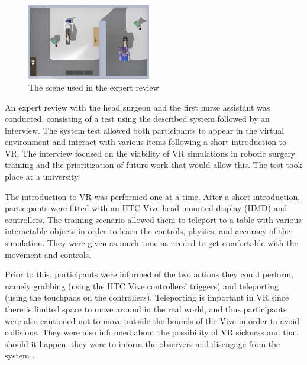 \documentclass[conference]{IEEEtran}
\begin{document}
\begin{figure}[tp]
\centering
\includegraphics[width=0.48\textwidth]{Figures/Scene.PNG}
\caption{The scene used in the expert review}
\label{fig:scene}
\end{figure}

An expert review with the head surgeon and the first nurse assistant was conducted, consisting of a test using the described system followed by an interview. The system test allowed both participants to appear in the virtual environment and interact with various items following a short introduction to VR. The interview focused on the viability of VR simulations in robotic surgery training and the prioritization of future work that would allow this. The test took place at a university. %

The introduction to VR was performed one at a time. After a short introduction, participants were fitted with an HTC Vive head mounted display (HMD) and controllers. The training scenario allowed them to teleport to a table with various interactable objects in order to learn the controls, physics, and accuracy of the simulation. They were given as much time as needed to get comfortable with the movement and controls.

Prior to this, participants were informed of the two actions they could perform, namely grabbing (using the HTC Vive controllers' triggers) and teleporting (using the touchpads on the controllers). Teleporting is important in VR since there is limited space to move around in the real world, and thus participants were also cautioned not to move outside the bounds of the Vive in order to avoid collisions. They were also informed about the possibility of VR sickness and that should it happen, they were to inform the observers and disengage from the system \citep{barrett_side_2004}.
\end{document}
